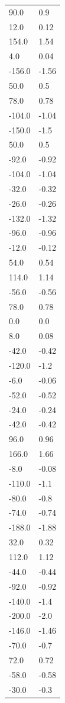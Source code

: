 \begin{longtable}{ll}
90.0 & 0.9 \\
12.0 & 0.12 \\
154.0 & 1.54 \\
4.0 & 0.04 \\
-156.0 & -1.56 \\
50.0 & 0.5 \\
78.0 & 0.78 \\
-104.0 & -1.04 \\
-150.0 & -1.5 \\
50.0 & 0.5 \\
-92.0 & -0.92 \\
-104.0 & -1.04 \\
-32.0 & -0.32 \\
-26.0 & -0.26 \\
-132.0 & -1.32 \\
-96.0 & -0.96 \\
-12.0 & -0.12 \\
54.0 & 0.54 \\
114.0 & 1.14 \\
-56.0 & -0.56 \\
78.0 & 0.78 \\
0.0 & 0.0 \\
8.0 & 0.08 \\
-42.0 & -0.42 \\
-120.0 & -1.2 \\
-6.0 & -0.06 \\
-52.0 & -0.52 \\
-24.0 & -0.24 \\
-42.0 & -0.42 \\
96.0 & 0.96 \\
166.0 & 1.66 \\
-8.0 & -0.08 \\
-110.0 & -1.1 \\
-80.0 & -0.8 \\
-74.0 & -0.74 \\
-188.0 & -1.88 \\
32.0 & 0.32 \\
112.0 & 1.12 \\
-44.0 & -0.44 \\
-92.0 & -0.92 \\
-140.0 & -1.4 \\
-200.0 & -2.0 \\
-146.0 & -1.46 \\
-70.0 & -0.7 \\
72.0 & 0.72 \\
-58.0 & -0.58 \\
-30.0 & -0.3 \\

\end{longtable}
